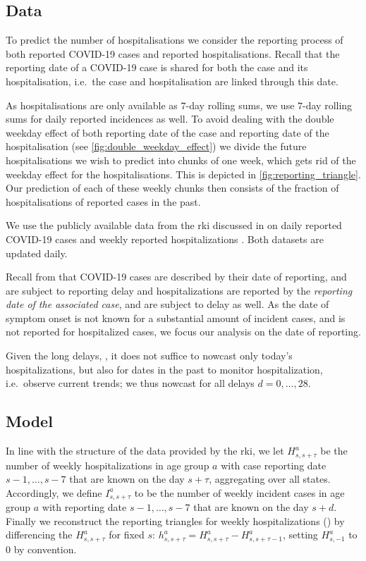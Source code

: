 \subsection{Data}
To predict the number of hospitalisations we consider the reporting
process of both reported COVID-19 cases and reported hospitalisations.
Recall that the reporting date of a COVID-19 case is shared for both the
case and its hospitalisation, i.e.~the case and hospitalisation are
linked through this date.

As hospitalisations are only available as \(7\)-day rolling sums, we use \(7\)-day rolling sums for daily
reported incidences as well. To avoid dealing with the double weekday
effect of both reporting date of the case and reporting date of the
hospitalisation (see \cref{fig:double_weekday_effect}) we divide the
future hospitalisations we wish to predict into chunks of one week,
which gets rid of the weekday effect for the hospitalisations. This is
depicted in \cref{fig:reporting_triangle}. Our prediction of each of
these weekly chunks then consists of the fraction of hospitalisations of
reported cases in the past.

We use the publicly available data from the \acrshort{rki} discussed in  on daily reported COVID-19 cases \cite{RobertKoch-Institut2024SARSCoV2} and weekly reported hospitalizations \cite{RobertKoch-Institut2024COVID19Hospitalisierungen}. Both datasets are updated daily.

Recall from  that COVID-19 cases are described by their date of reporting, and are subject to reporting delay and hospitalizations are reported by the \textit{reporting date of the associated case}, and are subject to delay as well. As the date of symptom onset is not known for a substantial amount of incident cases, and is not reported for hospitalized cases, we focus our analysis on the date of reporting.

Given the long delays, , it does not suffice to nowcast only today's hospitalizations, but also for dates in the past to monitor hospitalization, i.e.~observe current trends; we thus nowcast for all delays \(d = 0, \dots, 28\).

\subsection{Model}
In line with the structure of the data provided by the \acrshort{rki}, we let $H^a_{s,s + \tau}$ be the number of weekly hospitalizations in age group $a$ with case reporting date $s - 1, \dots, s - 7$ that are known on the day $s + \tau$, aggregating over all states. Accordingly, we define $I^a_{s,s + \tau}$ to be the number of weekly incident cases in age group $a$ with reporting date $s - 1, \dots, s - 7$ that are known on the day $s + d$. Finally we reconstruct the reporting triangles for weekly hospitalizations () by differencing the $H^a_{s,s + \tau}$ for fixed $s$: $h^a_{s,s + \tau} = H^a_{s,s + \tau} - H^a_{s, s + \tau - 1}$, setting $H^a_{s, -1}$ to $0$ by convention. 

